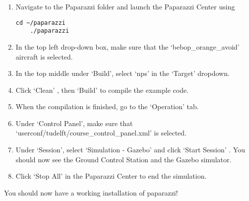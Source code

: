 \begin{enumerate}

\item Navigate to the Paparazzi folder and launch the Paparazzi Center using

\begin{lstlisting}[style=Bash]
	cd ~/paparazzi
	./paparazzi
\end{lstlisting}

\item In the top left drop-down box, make sure that the `bebop\_orange\_avoid' aircraft is selected.

\item In the top middle under `Build', select `nps' in the `Target' dropdown.

\item Click `Clean' , then `Build'  to compile the example code.

\item When the compilation is finished, go to the `Operation' tab.

\item Under `Control Panel', make sure that `userconf/tudelft/course\_control\_panel.xml' is selected. 

\item Under `Session', select `Simulation - Gazebo' and click `Start Session' . You should now see the Ground Control Station and the Gazebo simulator.

\item Click `Stop All'  in the Paparazzi Center to end the simulation.

\end{enumerate}

You should now have a working installation of paparazzi!